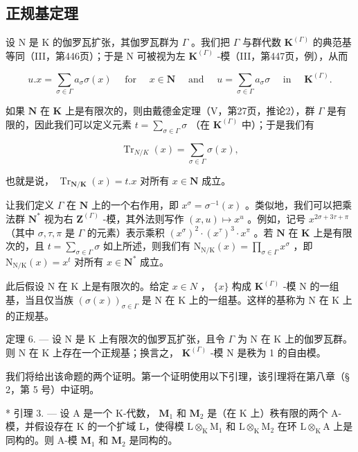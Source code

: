 \subsection{正规基定理}

设 N 是 K 的伽罗瓦扩张，其伽罗瓦群为 \(\Gamma\) 。我们把 \(\Gamma\) 与群代数 \(\mathbf{K}^{(\Gamma)}\) 的典范基等同（III，第446页）；于是 N 可被视为左 \(\mathbf{K}^{(\Gamma)}\) -模（III，第447页，例），从而

\[
u. x = \sum_ {\sigma \in \Gamma} a _ {\sigma} \sigma (x) \quad \text { for } \quad x \in \mathbf {N} \quad \text { and } \quad u = \sum_ {\sigma \in \Gamma} a _ {\sigma} \sigma \quad \text { in } \quad \mathbf {K} ^ {(\Gamma)}.
\]

如果 \(\mathbf{N}\) 在 \(\mathbf{K}\) 上是有限次的，则由戴德金定理（V，第27页，推论2），群 \(\Gamma\) 是有限的，因此我们可以定义元素 \(t = \sum_{\sigma \in \Gamma} \sigma\) （在 \(\mathbf{K}^{(\Gamma)}\) 中）；于是我们有

\[
\operatorname{Tr} _ {N / K} (x) = \sum_ {\sigma \in \Gamma} \sigma (x),
\]

也就是说， \(\operatorname{Tr}_{\mathbf{N} / \mathbf{K}}(x) = t.x\) 对所有 \(x \in \mathbf{N}\) 成立。

让我们定义 \(\Gamma\) 在 \(\mathbf{N}\) 上的一个右作用，即 \(x^{\sigma} = \sigma^{-1}(x)\) 。类似地，我们可以把乘法群 \(\mathbf{N}^{*}\) 视为右 \(\mathbf{Z}^{(\Gamma)}\) -模，其外法则写作 \((x, u) \mapsto x^u\) 。例如，记号 \(x^{2\sigma + 3\tau + \pi}\) （其中 \(\sigma, \tau, \pi\) 是 \(\Gamma\) 的元素）表示乘积 \((x^\sigma)^2 \cdot (x^\tau)^3 \cdot x^\pi\) 。若 \(\mathbf{N}\) 在 \(\mathbf{K}\) 上是有限次的，且 \(t = \sum_{\sigma \in \Gamma} \sigma\) 如上所述，则我们有 \(\mathrm{N}_{\mathrm{N/K}}(x) = \prod_{\sigma \in \Gamma} x^\sigma\) ，即 \(\mathrm{N}_{\mathrm{N/K}}(x) = x^t\) 对所有 \(x \in \mathbf{N}^*\) 成立。

此后假设 N 在 K 上是有限次的。给定 \(x \in N\) ， \(\{x\}\) 构成 \(\mathbf{K}^{(\Gamma)}\) -模 N 的一组基，当且仅当族 \((\sigma(x))_{\sigma \in \Gamma}\) 是 N 在 K 上的一组基。这样的基称为 N 在 K 上的正规基。

定理 6. --- 设 N 是 K 上有限次的伽罗瓦扩张，且令 \(\Gamma\) 为 N 在 K 上的伽罗瓦群。则 N 在 K 上存在一个正规基；换言之， \(\mathbf{K}^{(\Gamma)}\) -模 N 是秩为 1 的自由模。

我们将给出该命题的两个证明。第一个证明使用以下引理，该引理将在第八章（§ 2，第 5 号）中证明。

* 引理 3. --- 设 A 是一个 K-代数， \(\mathbf{M}_1\) 和 \(\mathbf{M}_2\) 是（在 K 上）秩有限的两个 A-模，并假设存在 K 的一个扩域 L，使得模 \(\mathrm{L} \otimes_{\mathrm{K}} \mathrm{M}_1\) 和 \(\mathrm{L} \otimes_{\mathrm{K}} \mathrm{M}_2\) 在环 \(\mathrm{L} \otimes_{\mathrm{K}} \mathrm{A}\) 上是同构的。则 A-模 \(\mathbf{M}_1\) 和 \(\mathbf{M}_2\) 是同构的。

